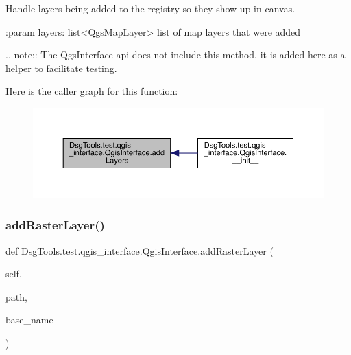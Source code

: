 \begin{DoxyVerb}Handle layers being added to the registry so they show up in canvas.

:param layers: list<QgsMapLayer> list of map layers that were added

.. note:: The QgsInterface api does not include this method,
    it is added here as a helper to facilitate testing.
\end{DoxyVerb}
 Here is the caller graph for this function\+:
\nopagebreak
\begin{figure}[H]
\begin{center}
\leavevmode
\includegraphics[width=350pt]{class_dsg_tools_1_1test_1_1qgis__interface_1_1_qgis_interface_a79e022db1fda34569e5b5f7f9e6b5d3a_icgraph}
\end{center}
\end{figure}
\mbox{\label{class_dsg_tools_1_1test_1_1qgis__interface_1_1_qgis_interface_aac206533e846e062e907d0dd9c9d4565}} 
\subsubsection{\texorpdfstring{add\+Raster\+Layer()}{addRasterLayer()}}
{\footnotesize\ttfamily def Dsg\+Tools.\+test.\+qgis\+\_\+interface.\+Qgis\+Interface.\+add\+Raster\+Layer (\begin{DoxyParamCaption}\item[{}]{self,  }\item[{}]{path,  }\item[{}]{base\+\_\+name }\end{DoxyParamCaption})}

